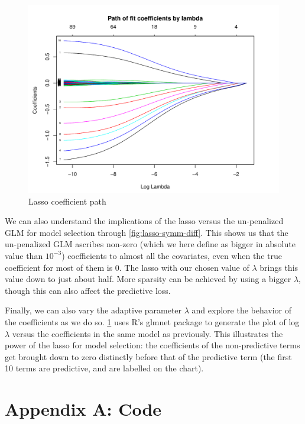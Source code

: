 \documentclass[letterpaper, 12pt]{article}
\begin{document}
\begin{figure}[tb]
\centering
\includegraphics[width=.8\textwidth]{figs/lasso-path}
\caption{Lasso coefficient path}
\label{fig:lasso-path}
\end{figure}

We can also understand the implications of the lasso versus the un-penalized GLM
for model selection through \cref{fig:lasso-symm-diff}. This shows us that the
un-penalized GLM ascribes non-zero (which we here define as bigger in absolute
value than $10^{-3}$) coefficients to almost all the covariates, even when the
true coefficient for most of them is 0. The lasso with our chosen value of
$\lambda$ brings this value down to just about half. More sparsity can be
achieved by using a bigger $\lambda$, though this can also affect the predictive
loss.


Finally, we can also vary the adaptive parameter $\lambda$ and explore the
behavior of the coefficients as we do so. \cref{fig:lasso-path} uses R's
\textsf{glmnet} package to generate the plot of log $\lambda$ versus the
coefficients in the same model as previously. This illustrates the power of the
lasso for model selection: the coefficients of the non-predictive terms get
brought down to zero distinctly before that of the predictive term (the first 10
terms are predictive, and are labelled on the chart).

\newpage



\newpage

\section*{Appendix A: Code}
\end{document}
